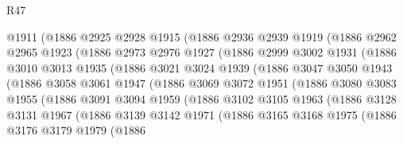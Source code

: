 \begin{lexlean}{R47}
\begin{coremodule}
              @1911
              (@1886
                @2925
                @2928
                @1915
                (@1886
                  @2936
                  @2939
                  @1919
                  (@1886
                    @2962
                    @2965
                    @1923
                    (@1886
                      @2973
                      @2976
                      @1927
                      (@1886
                        @2999
                        @3002
                        @1931
                        (@1886
                          @3010
                          @3013
                          @1935
                          (@1886
                            @3021
                            @3024
                            @1939
                            (@1886
                              @3047
                              @3050
                              @1943
                              (@1886
                                @3058
                                @3061
                                @1947
                                (@1886
                                  @3069
                                  @3072
                                  @1951
                                  (@1886
                                    @3080
                                    @3083
                                    @1955
                                    (@1886
                                      @3091
                                      @3094
                                      @1959
                                      (@1886
                                        @3102
                                        @3105
                                        @1963
                                        (@1886
                                          @3128
                                          @3131
                                          @1967
                                          (@1886
                                            @3139
                                            @3142
                                            @1971
                                            (@1886
                                              @3165
                                              @3168
                                              @1975
                                              (@1886
                                                @3176
                                                @3179
                                                @1979
                                                (@1886

\end{coremodule}
\end{lexlean}
